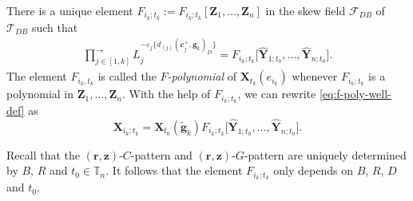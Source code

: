 \documentclass[11pt]{article}
\numberwithin{equation}{section}
\numberwithin{equation}{section}
\begin{document}
\begin{Definition}
 There is a unique element $F_{i_k;t_k}:=F_{i_k;t_k}[\mathbf{Z}_1,\dots, \mathbf{Z}_n]$ in the skew field $\mathcal{F}_{DB}$ of~$\mathcal{T}_{DB}$ such that
 \begin{align}\label{eq:gupta-formula}
 \prod\limits^{\longrightarrow}_{j\in[1,k]}L_{j}^{-\varepsilon_{j}\{d_{(j)}(\mathbf{c}_{j}^{+},\mathbf{g}_{k})_D\}}=F_{i_k;t_k}\big[\hat{\mathbf{Y}}_{1;t_0},\dots, \hat{\mathbf{Y}}_{n;t_0}\big].
 \end{align}
 The element $F_{i_k,t_k}$ is called the {\it $F$-polynomial} of $\mathbf{X}_{t_k}(e_{i_k})$ whenever $F_{i_k;t_k}$ is a polynomial in $\mathbf{Z}_1,\dots,\mathbf{Z}_n$. With the help of $F_{i_k;t_k}$, we can rewrite \eqref{eq:f-poly-well-def} as
 \[
 \mathbf{X}_{i_k;t_k}=\mathbf{X}_{t_0}(\tilde{\mathbf{g}}_k)F_{i_k;t_k}\big[\hat{\mathbf{Y}}_{1;t_0},\dots, \hat{\mathbf{Y}}_{n;t_0}\big].
 \]

\end{Definition}
\begin{Remark}
 Recall that the $(\mathbf{r},\mathbf{z})$-$C$-pattern and $(\mathbf{r},\mathbf{z})$-$G$-pattern are uniquely determined by $B$, $R$ and $t_0\in \mathbb{T}_n$. It follows that the element $F_{i_k;t_k}$ only depends on $B$, $R$, $D$ and $t_0$.
\end{Remark}
\end{document}
